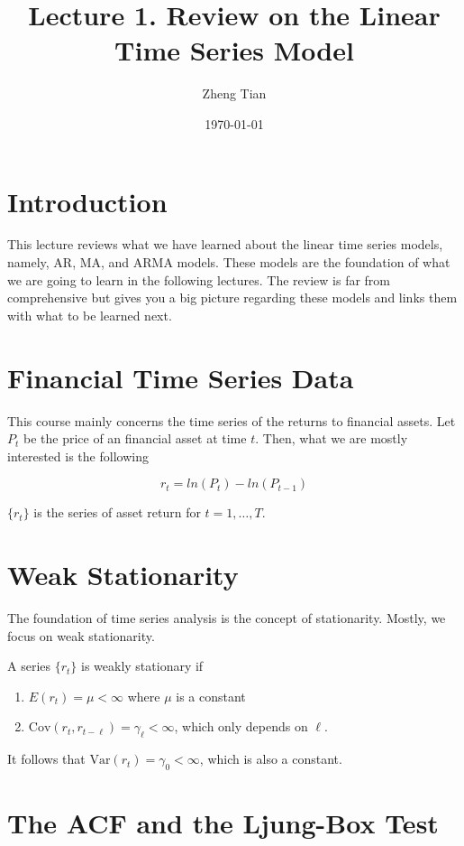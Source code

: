 \documentclass[a4paper,11pt]{article}
\author{Zheng Tian}
\date{\today}
\title{Lecture 1. Review on the Linear Time Series Model}
\newcommand{\var}{\mathrm{Var}}
\newcommand{\cov}{\mathrm{Cov}}
\begin{document}
\maketitle
\setcounter{tocdepth}{1}
\tableofcontents



\section{Introduction}
\label{sec:org0f1543c}

This lecture reviews what we have learned about the linear time series
models, namely, AR, MA, and ARMA models. These models are the
foundation of what we are going to learn in the following lectures. The
review is far from comprehensive but gives you a big picture regarding
these models and links them with what to be learned next. 


\section{Financial Time Series Data}
\label{sec:org325285c}

This course mainly concerns the time series of the returns to
financial assets. Let \(P_t\) be the price of an financial asset at time
\(t\). Then, what we are mostly interested is the following

\[ r_t = ln(P_t) - ln(P_{t-1}) \]

\(\{r_t\}\) is the series of asset return for \(t = 1, \ldots, T\). 


\section{Weak Stationarity}
\label{sec:orgce3229e}

The foundation of time series analysis is the concept of stationarity. Mostly, we
focus on weak stationarity. 

A series \(\{r_t\}\) is weakly stationary if
\begin{enumerate}
\item \(E(r_t) = \mu < \infty\) where \(\mu\) is a constant
\item \(\cov(r_t, r_{t-\ell}) = \gamma_{\ell} < \infty\), which only depends on \(\ell\).
\end{enumerate}

It follows that \(\var(r_t) = \gamma_0 < \infty\), which is also a
constant. 


\section{The ACF and the Ljung-Box Test}
\label{sec:org3906545}
\end{document}
